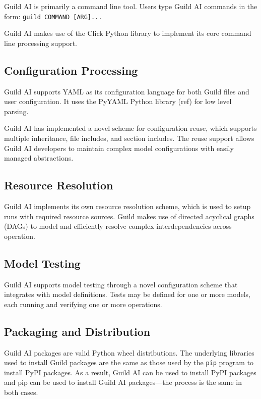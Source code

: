 \documentclass{article}
\begin{document}
Guild AI is primarily a command line tool. Users type Guild AI
commands in the form: \verb|guild COMMAND [ARG]...|

Guild AI makes use of the Click Python library \cite{click} to
implement its core command line processing support.

\subsection{Configuration Processing}

Guild AI supports YAML \cite{yaml} as its configuration language for both
Guild files and user configuration. It uses the PyYAML Python library
(ref) for low level parsing.

Guild AI has implemented a novel scheme for configuration reuse, which
supports multiple inheritance, file includes, and section
includes. The reuse support allows Guild AI developers to maintain
complex model configurations with easily managed abstractions.

\subsection{Resource Resolution}

Guild AI implements its own resource resolution scheme, which is used
to setup runs with required resource sources. Guild makes use of
directed acyclical graphs (DAGs) to model and efficiently resolve
complex interdependencies across operation.

\subsection{Model Testing}

Guild AI supports model testing through a novel configuration scheme
that integrates with model definitions. Tests may be defined for one
or more models, each running and verifying one or more operations.

\subsection{Packaging and Distribution}

Guild AI packages are valid Python wheel distributions. The underlying
libraries used to install Guild packages are the same as those used by
the \verb|pip| program to install PyPI packages. As a result, Guild
AI can be used to install PyPI packages and pip can be used to install
Guild AI packages---the process is the same in both cases.
\end{document}

